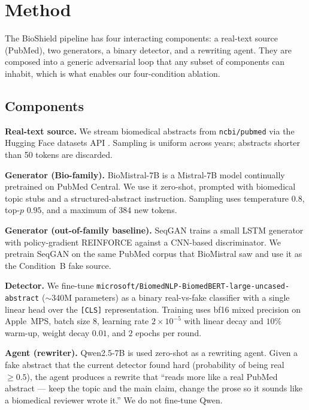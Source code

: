\documentclass[conference]{IEEEtran}
\begin{document}
\section{Method}
\label{sec:method}

The BioShield pipeline has four interacting components: a real-text source
(PubMed), two generators, a binary detector, and a rewriting agent. They are
composed into a generic adversarial loop that any subset of components can
inhabit, which is what enables our four-condition ablation.

\subsection{Components}
\label{ssec:components}

\textbf{Real-text source.} We stream biomedical abstracts from
\texttt{ncbi/pubmed} via the Hugging Face datasets API
\cite{lhoest2021hfdatasets}. Sampling is uniform across years; abstracts
shorter than 50 tokens are discarded.

\textbf{Generator (Bio-family).} BioMistral-7B
\cite{labrak2024biomistral} is a Mistral-7B \cite{jiang2023mistral} model
continually pretrained on PubMed Central. We use it zero-shot, prompted
with biomedical topic stubs and a structured-abstract instruction. Sampling
uses temperature \(0.8\), top-\(p\) \(0.95\), and a maximum of \(384\)
new tokens.

\textbf{Generator (out-of-family baseline).} SeqGAN \cite{yu2017seqgan}
trains a small LSTM generator with policy-gradient REINFORCE against a
CNN-based discriminator. We pretrain SeqGAN on the same PubMed corpus that
BioMistral saw and use it as the Condition~B fake source.

\textbf{Detector.} We fine-tune
\texttt{microsoft/BiomedNLP-BiomedBERT-large-uncased-abstract}
\cite{gu2021biomedbert} (\(\sim\)340M parameters) as a binary
real-vs-fake classifier with a single linear head over the
\texttt{[CLS]} representation. Training uses bf16 mixed precision on
Apple~MPS, batch size \(8\), learning rate \(2 \times 10^{-5}\) with
linear decay and \(10\%\) warm-up, weight decay \(0.01\), and
\(2\) epochs per round.

\textbf{Agent (rewriter).} Qwen2.5-7B \cite{qwen2024technical} is used
zero-shot as a rewriting agent. Given a fake abstract that the current
detector found hard (probability of being real $\geq 0.5$), the agent
produces a rewrite that ``reads more like a real PubMed abstract — keep
the topic and the main claim, change the prose so it sounds like a
biomedical reviewer wrote it.'' We do not fine-tune Qwen.
\end{document}
